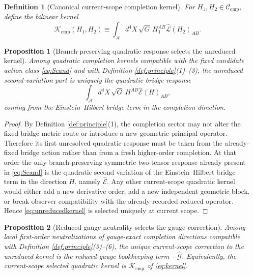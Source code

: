 \documentclass[11pt]{article}
\newcommand{\Sub}{\mathcal A}
\newcommand{\SubEinLin}{\widehat{\mathcal E}}
\newcommand{\SubGaugeBook}{\widehat{\mathcal G}}
\newcommand{\SubReducedEin}{\widehat{\mathcal L}}
\newcommand{\CompClass}{\mathscr C_{\mathrm{cmp}}}
\newcommand{\CompKernel}{\mathscr K_{\mathrm{cmp}}}
\newtheorem{definition}{Definition}
\newtheorem{proposition}{Proposition}
\begin{document}
\begin{definition}[Canonical current-scope completion kernel]
\label{def:kernel}
For \(H_1,H_2\in\CompClass\), define the bilinear kernel
\begin{equation}
\CompKernel(H_1,H_2)
\equiv
\int_{\Sub} d^4X\,\sqrt{G}\,
H_1^{AB}\SubReducedEin(H_2)_{AB}.
\label{eq:kernel}
\end{equation}
\end{definition}

\begin{proposition}[Branch-preserving quadratic response selects the unreduced kernel]
\label{prop:EHkernel}
Among quadratic completion kernels compatible with the fixed candidate action class \eqref{eq:Scand} and with Definition \ref{def:principle}(1)--(3), the unreduced second-variation part is uniquely the quadratic bridge response
\begin{equation}
\int_{\Sub} d^4X\,\sqrt{G}\,
H^{AB}\SubEinLin(H)_{AB},
\label{eq:unreducedkernel}
\end{equation}
coming from the Einstein--Hilbert bridge term in the completion direction.
\end{proposition}

\begin{proof}
By Definition \ref{def:principle}(1), the completion sector may not alter the fixed bridge metric route or introduce a new geometric principal operator. Therefore its first unresolved quadratic response must be taken from the already-fixed bridge action rather than from a fresh higher-order completion. At that order the only branch-preserving symmetric two-tensor response already present in \eqref{eq:Scand} is the quadratic second variation of the Einstein--Hilbert bridge term in the direction \(H\), namely \(\SubEinLin\). Any other current-scope quadratic kernel would either add a new derivative order, add a new independent geometric block, or break observer compatibility with the already-recorded reduced operator. Hence \eqref{eq:unreducedkernel} is selected uniquely at current scope.
\end{proof}

\begin{proposition}[Reduced-gauge neutrality selects the gauge correction]
\label{prop:gaugekernel}
Among local first-order neutralizations of gauge-exact completion directions compatible with Definition \ref{def:principle}(3)--(6), the unique current-scope correction to the unreduced kernel is the reduced-gauge bookkeeping term \(-\SubGaugeBook\). Equivalently, the current-scope selected quadratic kernel is \(\CompKernel\) of \eqref{eq:kernel}.
\end{proposition}
\end{document}
